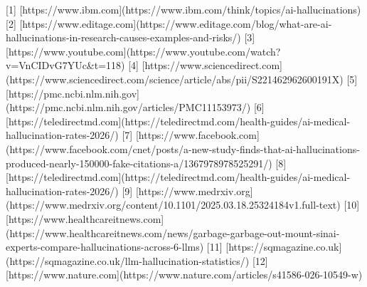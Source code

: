 [1] [https://www.ibm.com](https://www.ibm.com/think/topics/ai-hallucinations)
[2] [https://www.editage.com](https://www.editage.com/blog/what-are-ai-hallucinations-in-research-causes-examples-and-risks/)
[3] [https://www.youtube.com](https://www.youtube.com/watch?v=VnCIDvG7YUc&t=118)
[4] [https://www.sciencedirect.com](https://www.sciencedirect.com/science/article/abs/pii/S221462962600191X)
[5] [https://pmc.ncbi.nlm.nih.gov](https://pmc.ncbi.nlm.nih.gov/articles/PMC11153973/)
[6] [https://teledirectmd.com](https://teledirectmd.com/health-guides/ai-medical-hallucination-rates-2026/)
[7] [https://www.facebook.com](https://www.facebook.com/cnet/posts/a-new-study-finds-that-ai-hallucinations-produced-nearly-150000-fake-citations-a/1367978978525291/)
[8] [https://teledirectmd.com](https://teledirectmd.com/health-guides/ai-medical-hallucination-rates-2026/)
[9] [https://www.medrxiv.org](https://www.medrxiv.org/content/10.1101/2025.03.18.25324184v1.full-text)
[10] [https://www.healthcareitnews.com](https://www.healthcareitnews.com/news/garbage-garbage-out-mount-sinai-experts-compare-hallucinations-across-6-llms)
[11] [https://sqmagazine.co.uk](https://sqmagazine.co.uk/llm-hallucination-statistics/)
[12] [https://www.nature.com](https://www.nature.com/articles/s41586-026-10549-w)
